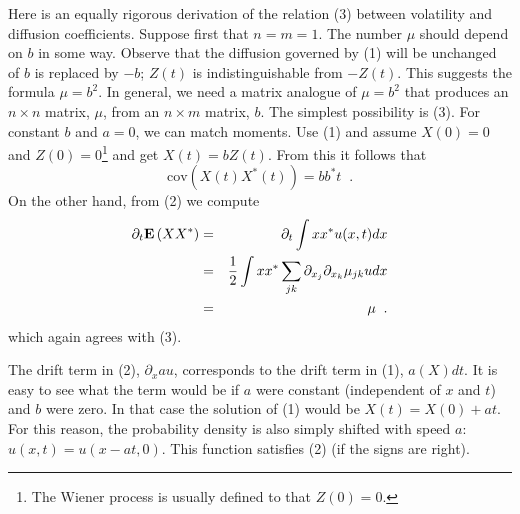 Here is an equally rigorous derivation of the relation (3) between volatility
and diffusion coefficients.  Suppose first that $n = m = 1$.  The number
$\mu$ should depend on $b$ in some way.  Observe that the diffusion
governed by (1) will be unchanged of $b$ is replaced by $-b$; $Z(t)$
is indistinguishable from $-Z(t)$.  This suggests the formula $\mu = b^2$.
In general, we need a matrix analogue of $\mu = b^2$ that produces
an $n \times n$ matrix, $\mu$, from an $n \times m$ matrix, $b$.  The
simplest possibility is (3).  For constant $b$ and $a=0$, we can match
moments.  Use (1) and assume $X(0) = 0$ and $Z(0) = 0$\footnote{The Wiener
process is usually defined to that $Z(0)=0$.} and get $X(t) = bZ(t)$.
From this it follows that
\begin{displaymath}
\mbox{cov}\left( X(t)X^*(t) \right) = bb^* t \;\; .
\end{displaymath}
On the other hand, from (2) we compute
\begin{eqnarray*}
\partial_t \mbox{\bf E} \left( XX^* \right) & = &
        \partial_t \int xx^* u(x,t)dx  \\
     & = &
        \frac{1}{2}
          \int xx^* \sum_{jk} \partial_{x_j}\partial_{x_k} \mu_{jk} u dx \\
     & = &
         \mu \;\; .
\end{eqnarray*}
which again agrees with (3).

The drift term in (2), $\partial_x au$, corresponds to the drift term
in (1), $a(X)dt$.  It is easy to see what the term would be if $a$ were
constant (independent of $x$ and $t$) and $b$ were zero.  In that case
the solution of (1) would be $X(t) = X(0) + at$.  For this reason,
the probability density is also simply shifted with speed $a$:
$u(x,t) = u(x-at,0)$.  This function satisfies (2) (if the signs are
right).

